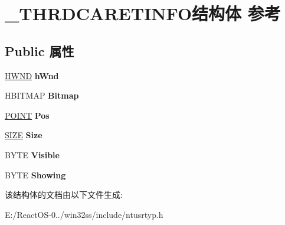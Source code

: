 \hypertarget{struct___t_h_r_d_c_a_r_e_t_i_n_f_o}{}\section{\+\_\+\+T\+H\+R\+D\+C\+A\+R\+E\+T\+I\+N\+F\+O结构体 参考}
\label{struct___t_h_r_d_c_a_r_e_t_i_n_f_o}
\subsection*{Public 属性}
\begin{DoxyCompactItemize}
\item 
\mbox{\label{struct___t_h_r_d_c_a_r_e_t_i_n_f_o_a9e693103b72ba1f94721d691b19fe827}} 
\hyperlink{interfacevoid}{H\+W\+ND} {\bfseries h\+Wnd}
\item 
\mbox{\label{struct___t_h_r_d_c_a_r_e_t_i_n_f_o_a2d53e639ea4f3e30ab0fb9a08a61a7b7}} 
H\+B\+I\+T\+M\+AP {\bfseries Bitmap}
\item 
\mbox{\label{struct___t_h_r_d_c_a_r_e_t_i_n_f_o_a4db3ff71ac109c32be4dc7f185191f3d}} 
\hyperlink{structtag_p_o_i_n_t}{P\+O\+I\+NT} {\bfseries Pos}
\item 
\mbox{\label{struct___t_h_r_d_c_a_r_e_t_i_n_f_o_acfca2546e4f866f6837d41c28ee7eb47}} 
\hyperlink{structtag_s_i_z_e}{S\+I\+ZE} {\bfseries Size}
\item 
\mbox{\label{struct___t_h_r_d_c_a_r_e_t_i_n_f_o_a1c04da34082383edab8ff10a1bffa096}} 
B\+Y\+TE {\bfseries Visible}
\item 
\mbox{\label{struct___t_h_r_d_c_a_r_e_t_i_n_f_o_a160890e84ace9b05db8fca3e36db883f}} 
B\+Y\+TE {\bfseries Showing}
\end{DoxyCompactItemize}


该结构体的文档由以下文件生成\+:\begin{DoxyCompactItemize}
\item 
E\+:/\+React\+O\+S-\/0../win32ss/include/ntusrtyp.\+h\end{DoxyCompactItemize}
